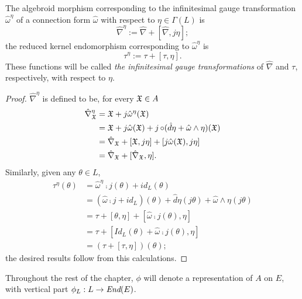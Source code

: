 \begin{proposition}\label{propositionInfinitesimalGaugeTransformationOfAlgebroidEndomorphismOfConnection}
The algebroid morphism corresponding to the infinitesimal gauge transformation $\hat \omega^\eta$ of a connection form $\hat \omega$ with respect to $\eta \in \Gamma(L)$ is 
\begin{equation}
    \hat \nabla^\eta := \hat \nabla + [\hat \nabla, j\eta];
\end{equation}
the reduced kernel endomorphism corresponding to $\hat \omega^\eta$ is
\begin{equation}
    \tau^\eta := \tau + [\tau, \eta].
\end{equation}
These functions will be called \emph{the infinitesimal gauge transformations} of $\hat \nabla$ and $\tau$, respectively, with respect to $\eta$.
\end{proposition}
\begin{proof}
$\hat \nabla^\eta$ is defined to be, for every $\mathfrak{X} \in A$
\begin{align*}
    \hat \nabla^\eta_{\mathfrak{X}} &=
        \mathfrak{X} + j\hat \omega^\eta(\mathfrak{X}) \\
        &= \mathfrak{X} + j\hat \omega(\mathfrak{X}) + j \operatorname{\circ} (\hat d \eta + \hat \omega \wedge \eta)(\mathfrak{X}) \\
        &= \hat \nabla_{\mathfrak{X}} + [\mathfrak{X}, j\eta] + [j\hat \omega (\mathfrak{X}), j\eta]\\
        &= \hat \nabla_{\mathfrak{X}} + [\hat \nabla_{\mathfrak{X}}, \eta].
\end{align*}
Similarly, given any $\theta \in L$,
\begin{align*}
    \tau^\eta (\theta)
        &= \hat \omega^\eta \comp j(\theta) + id_L(\theta) \\
        &= (\hat \omega \comp j + id_L)(\theta) + \hat d \eta (j \theta) + \hat \omega \wedge \eta(j \theta)\\
        &= \tau + [\theta, \eta] + [\hat \omega \comp j(\theta), \eta] \\
        &= \tau + [Id_L(\theta) + \hat \omega \comp j(\theta) , \eta]\\
        &= (\tau + [\tau, \eta])(\theta);
\end{align*}
the desired results follow from this calculations.
\end{proof}



Throughout the rest of the chapter, $\phi$ will denote a representation of $A$ on $E$, with vertical part $\phi_L: L \to \End(E)$.

